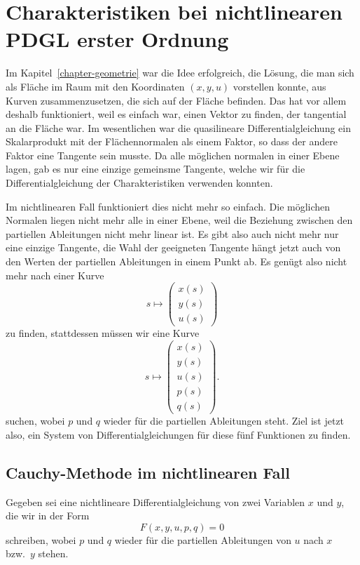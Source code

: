 %
%
%
\section{Charakteristiken bei nichtlinearen PDGL erster Ordnung}
Im Kapitel~\ref{chapter-geometrie} war die Idee erfolgreich, die Lösung,
die man sich als Fläche im Raum mit den Koordinaten $(x,y,u)$
vorstellen konnte, aus Kurven zusammenzusetzen, die sich auf der
Fläche befinden. Das hat vor allem deshalb funktioniert, weil es
einfach war, einen Vektor zu finden, der tangential an die Fläche
war. Im wesentlichen war die quasilineare Differentialgleichung ein
Skalarprodukt mit der Flächennormalen als einem Faktor, so dass
der andere Faktor eine Tangente sein musste. Da alle möglichen
normalen in einer Ebene lagen, gab es nur eine einzige gemeinsme
Tangente, welche wir für die Differentialgleichung der
Charakteristiken verwenden konnten.

Im nichtlinearen Fall funktioniert dies nicht mehr so einfach.
Die möglichen Normalen liegen nicht mehr alle in einer Ebene,
weil die Beziehung zwischen den partiellen Ableitungen nicht
mehr linear ist. Es gibt also auch nicht mehr nur eine einzige
Tangente, die Wahl der geeigneten Tangente hängt jetzt auch
von den Werten der partiellen Ableitungen in einem Punkt ab.
Es genügt also nicht mehr nach einer Kurve
\[
s\mapsto
\begin{pmatrix}
x(s)\\
y(s)\\
u(s)
\end{pmatrix}
\]
zu finden, stattdessen müssen wir eine Kurve 
\[
s\mapsto
\begin{pmatrix}
x(s)\\
y(s)\\
u(s)\\
p(s)\\
q(s)
\end{pmatrix}.
\]
suchen, wobei $p$ und $q$ wieder für die partiellen Ableitungen
steht. Ziel ist jetzt also, ein System von Differentialgleichungen
für diese fünf Funktionen zu finden.

\subsection{Cauchy-Methode im nichtlinearen Fall}
Gegeben sei eine nichtlineare Differentialgleichung von zwei
Variablen $x$ und $y$, die wir in der Form
\[
F(x,y,u,p,q)=0
\]
schreiben, wobei $p$ und $q$ wieder für die partiellen Ableitungen
von $u$ nach $x$ bzw.~$y$ stehen.

